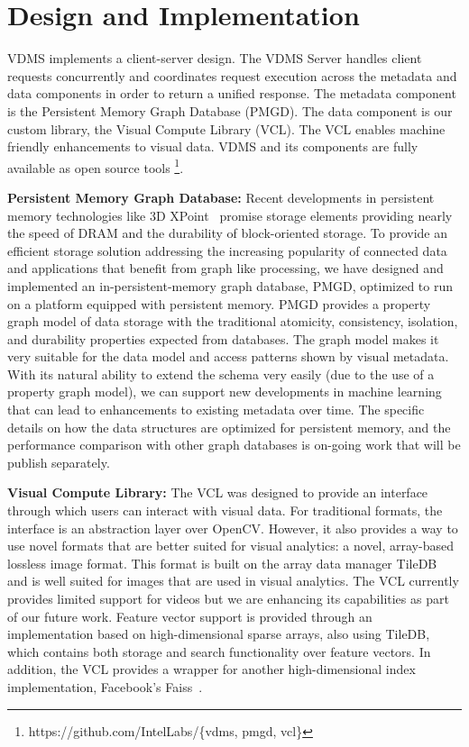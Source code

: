 \section{Design and Implementation}
\label{arch}

VDMS implements a client-server design.
The VDMS Server handles client requests concurrently and coordinates
request execution across the metadata and data components in order to return a
unified response. The metadata component is the Persistent Memory Graph
Database (PMGD). The data component is our custom library, the
Visual Compute Library (VCL). The VCL enables machine friendly enhancements to
visual data.
VDMS and its components are fully available as open source tools
\footnote{https://github.com/IntelLabs/\{vdms, pmgd, vcl\}}.

\textbf{Persistent Memory Graph Database:}
Recent developments in persistent memory technologies
like 3D XPoint~\cite{IntelXPoint15}
promise storage elements  providing  nearly  the  speed  of  DRAM  and  the
durability of block-oriented storage. To provide an efficient storage
solution addressing the increasing popularity of connected data and
applications that benefit from graph like processing, we have designed
and implemented an in-persistent-memory graph database, PMGD, optimized
to run on a platform equipped with persistent memory.
PMGD provides a property graph model of data storage with the traditional
atomicity, consistency, isolation, and durability properties expected from
databases. The graph model makes it very suitable for the data model and
access patterns shown by visual metadata.
With its natural ability to extend the schema very
easily (due to the use of a property graph model),
we can support new developments in machine learning that can lead to
enhancements to existing metadata over time.
The specific details on how the data structures are optimized for persistent
memory, and the performance comparison with other graph databases is on-going
work that will be publish separately.

\textbf{Visual Compute Library:} The VCL was designed to provide an interface
through which users can interact with visual data. For traditional formats,
the interface is an abstraction layer over OpenCV. However, it also provides a
way to use novel formats that are better suited for visual analytics: a novel,
array-based lossless image format. This format is built on the array data
manager TileDB~\cite{TileDB} and is well suited for images that are used in
visual analytics.
The VCL currently provides limited support for videos but we are enhancing
its capabilities as part of our future work.
Feature vector support is provided through an implementation based
on high-dimensional sparse arrays, also using TileDB, which contains both
storage and search functionality over feature vectors.
In addition, the VCL provides a wrapper
for another high-dimensional index implementation,
Facebook's Faiss~\cite{faiss}.

